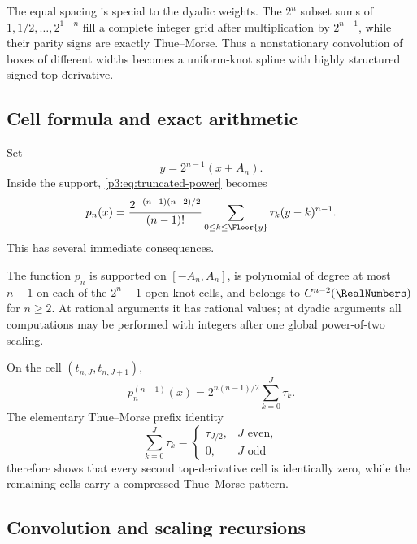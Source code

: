 \documentclass[11pt,oneside]{article}
\numberwithin{equation}{section}
\theoremstyle{definition}
\theoremstyle{remark}
\begin{document}
The equal spacing is special to the dyadic weights.  The $2^n$ subset sums of
$1,1/2,\ldots,2^{1-n}$ fill a complete integer grid after multiplication by
$2^{n-1}$, while their parity signs are exactly Thue--Morse.  Thus a nonstationary
convolution of boxes of different widths becomes a uniform-knot spline with highly
structured signed top derivative.

\subsection{Cell formula and exact arithmetic}

Set
\begin{equation}
 y=2^{n-1}(x+A_n).
 \label{p3:eq:cell-coordinate}
\end{equation}
Inside the support, \cref{p3:eq:truncated-power} becomes
\begin{equation}
 p_n(x)=\frac{2^{-(n-1)(n-2)/2}}{(n-1)!}
 \sum_{0\le k\le\Floor{y}}\tau_k(y-k)^{n-1}.
 \label{p3:eq:scaled-cell-formula}
\end{equation}
This has several immediate consequences.

\begin{corollary}
\label{p3:cor:piecewise-arithmetic}
The function $p_n$ is supported on $[-A_n,A_n]$, is polynomial of degree at most
$n-1$ on each of the $2^n-1$ open knot cells, and belongs to $C^{n-2}(\RealNumbers)$ for
$n\ge2$.  At rational arguments it has rational values; at dyadic arguments all
computations may be performed with integers after one global power-of-two scaling.
\end{corollary}

On the cell $(t_{n,J},t_{n,J+1})$,
\begin{equation}
 p_n^{(n-1)}(x)=2^{n(n-1)/2}\sum_{k=0}^{J}\tau_k.
 \label{p3:eq:top-cell-value}
\end{equation}
The elementary Thue--Morse prefix identity
\begin{equation}
 \sum_{k=0}^{J}\tau_k=
 \begin{cases}
   \tau_{J/2},&J\text{ even},\\
   0,&J\text{ odd}
 \end{cases}
 \label{p3:eq:tm-prefix}
\end{equation}
therefore shows that every second top-derivative cell is identically zero, while the
remaining cells carry a compressed Thue--Morse pattern.

\subsection{Convolution and scaling recursions}
\end{document}
